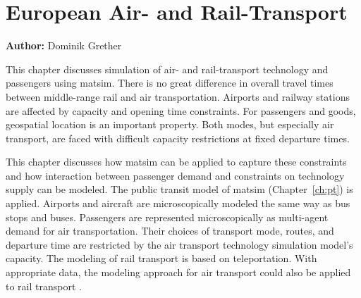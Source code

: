 \chapter{European Air- and Rail-Transport}
\label{ch:air}

\hfill \textbf{Author:} Dominik Grether





This chapter discusses simulation of air- and rail-transport technology and passengers using \gls{matsim}. 
There is no great difference in overall travel times between middle-range rail and air transportation. 
Airports and railway stations are affected by capacity and opening time constraints. 
For passengers and goods, geospatial location is an important property. 
Both modes, but especially air transport, are faced with difficult capacity restrictions at fixed departure times. 

This chapter discusses how \gls{matsim} can be applied to capture these constraints and how interaction between passenger demand and constraints on technology supply can be modeled. 
The public transit model of \gls{matsim} (Chapter~\ref{ch:pt}) is applied. %
Airports and aircraft are microscopically modeled the same way as bus stops and buses. 
Passengers are represented microscopically as multi-agent demand for air transportation. 
Their choices of transport mode, routes, and departure time are restricted by the air transport technology simulation model's capacity. 
The modeling of rail transport is based on \gls{teleportation}. 
With appropriate data, the modeling approach for air transport could also be applied to rail transport \citep{Quick2012BARailTraffic}.  

